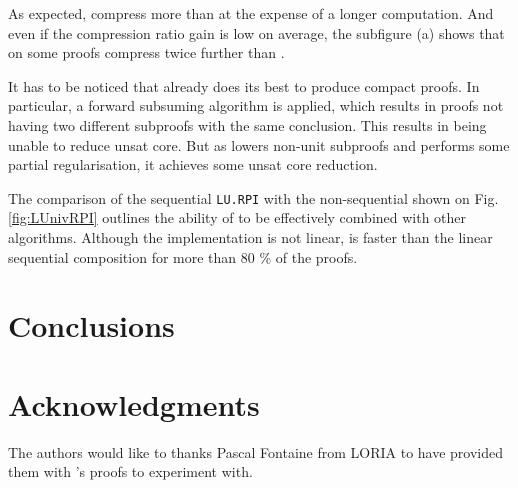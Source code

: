 \documentclass{llncs}
\begin{document}


As expected, {\LowerUnivalents} compress more than {\LowerUnits} at the expense of a longer
computation. And even if the compression ratio gain is low on average, the subfigure (a) shows that
on some proofs {\LowerUnivalents} compress twice further than {\LowerUnits}.

It has to be noticed that \veriT already does its best to produce compact proofs. In particular,
a forward subsuming algorithm is applied, which results in proofs not having two different subproofs
with the same conclusion. This results in {\LowerUnits} being unable to reduce unsat core.
But as {\LowerUnivalents} lowers non-unit subproofs and performs some partial regularisation, it
achieves some unsat core reduction.

The comparison of the sequential \texttt{LU.RPI} with the non-sequential {\LUnivRPI} shown on Fig.
\ref{fig:LUnivRPI} outlines the ability of {\LowerUnivalents} to be effectively combined with other
algorithms. Although the implementation is not linear, {\LUnivRPI} is faster than the linear
sequential composition for more than 80 \% of the proofs.










\FloatBarrier
\section{Conclusions}

\section*{Acknowledgments}

The authors would like to thanks Pascal Fontaine from LORIA to have provided them with {\veriT}'s
proofs to experiment with.



\end{document}
